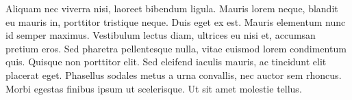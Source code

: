 Aliquam nec viverra nisi, laoreet bibendum ligula. Mauris lorem neque, blandit eu mauris in, porttitor tristique neque. Duis eget ex est. Mauris elementum nunc id semper maximus. Vestibulum lectus diam, ultrices eu nisi et, accumsan pretium eros. Sed pharetra pellentesque nulla, vitae euismod lorem condimentum quis. Quisque non porttitor elit. Sed eleifend iaculis mauris, ac tincidunt elit placerat eget. Phasellus sodales metus a urna convallis, nec auctor sem rhoncus. Morbi egestas finibus ipsum ut scelerisque. Ut sit amet molestie tellus.
